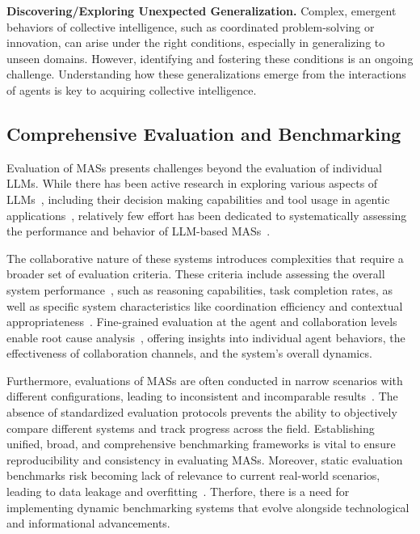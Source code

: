 \documentclass[acmsmall,nonacm]{acmart}
\begin{document}
        \textbf{Discovering/Exploring Unexpected Generalization.} Complex, emergent behaviors of collective intelligence, such as coordinated problem-solving or innovation, can arise under the right conditions, especially in generalizing to unseen domains. However, identifying and fostering these conditions is an ongoing challenge. Understanding how these generalizations emerge from the interactions of agents is key to acquiring collective intelligence.

    \subsection{Comprehensive Evaluation and Benchmarking}
        Evaluation of MASs presents challenges beyond the evaluation of individual LLMs. While there has been active research in exploring various aspects of LLMs~\cite{chang2024survey}, including their decision making capabilities and tool usage in agentic applications~\cite{patil2024gorilla,peng2024survey}, relatively few effort has been dedicated to systematically assessing the performance and behavior of LLM-based MASs~\cite{liu2024agentbench}.

        The collaborative nature of these systems introduces complexities that require a broader set of evaluation criteria. These criteria include assessing the overall system performance~\cite{zhao2024competeai}, such as reasoning capabilities, task completion rates, as well as specific system characteristics like coordination efficiency and contextual appropriateness~\cite{10.1145/3593013.3594033}. Fine-grained evaluation at the agent and collaboration levels enable root cause analysis~\cite{ji2024testingunderstandingerroneousplanning}, offering insights into individual agent behaviors, the effectiveness of collaboration channels, and the system's overall dynamics.

        Furthermore, evaluations of MASs are often conducted in narrow scenarios with different configurations, leading to inconsistent and incomparable results~\cite{davidson2024evaluating,chen-etal-2024-llmarena,chan2024chateval}. The absence of standardized evaluation protocols prevents the ability to objectively compare different systems and track progress across the field. Establishing unified, broad, and comprehensive benchmarking frameworks is vital to ensure reproducibility and consistency in evaluating MASs. Moreover, static evaluation benchmarks risk becoming lack of relevance to current real-world scenarios, leading to data leakage and overfitting~\cite{peng2024survey}. Therfore, there is a need for implementing dynamic benchmarking systems that evolve alongside technological and informational advancements.
\end{document}
